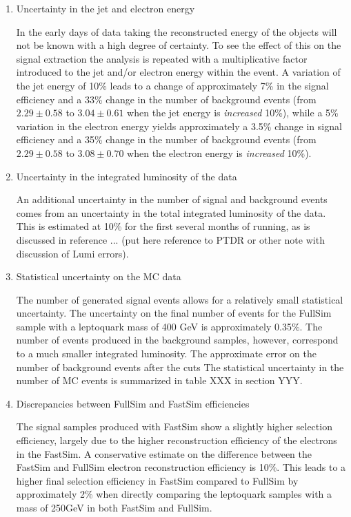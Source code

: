\begin{enumerate}
\item Uncertainty in the jet and electron energy 

In the early days of data taking the reconstructed energy of the objects will not be known with a high degree of certainty.  To see the effect of this on the signal extraction the analysis 
is repeated with a multiplicative factor introduced to the jet and/or electron energy within the event.   A variation of the jet energy of 10\% leads to a change of approximately 7\% in the signal efficiency and a 33\% change in the number of background events (from $2.29 \pm 0.58$ to $3.04 \pm 0.61$ when the jet energy is {\sl increased} 10\%),
while a 5\% variation in the electron energy yields approximately a 3.5\% change in signal efficiency and a 35\% change in the number of background events (from $2.29 \pm 0.58$ to $3.08 \pm 0.70$ when the electron energy is {\sl increased} 10\%).  


\item Uncertainty in the integrated luminosity of the data

An additional uncertainty in the number of signal and background events comes from an uncertainty in the total integrated luminosity of the data.  
This is estimated at 10\% for the first several months of running, as is discussed in reference ... (put here reference to PTDR or other note with discussion of Lumi errors).

\item Statistical uncertainty on the MC data

The number of generated signal events allows for a relatively small statistical uncertainty.  The uncertainty on the final number of events for the FullSim sample with a leptoquark mass of 400 GeV is 
approximately 0.35\%.  The number of events produced in the background samples, however, correspond to a much smaller integrated luminosity.  The approximate error on the number of background events after the cuts
The statistical uncertainty in the number of MC events is summarized in table XXX in section YYY.  

\item Discrepancies between FullSim and FastSim efficiencies

The signal samples produced with FastSim show a slightly higher selection efficiency, largely due to the higher reconstruction efficiency of the 
electrons in the FastSim.  A conservative estimate on the difference between the FastSim and FullSim electron reconstruction efficiency is 10\%.  This leads to a higher final selection
 efficiency in FastSim compared to FullSim by approximately 2\% when directly comparing the leptoquark samples with a mass of 250GeV in both FastSim and FullSim.  
 

\end{enumerate}
